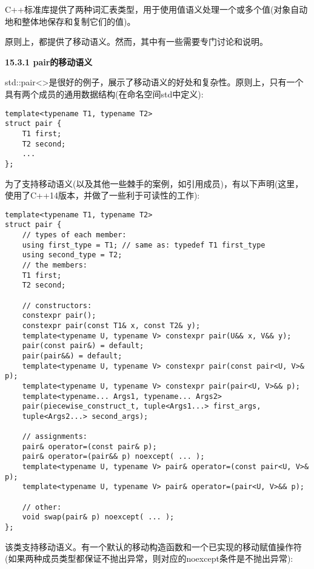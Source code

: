 C++标准库提供了两种词汇表类型，用于使用值语义处理一个或多个值(对象自动地和整体地保存和复制它们的值)。\par

原则上，都提供了移动语义。然而，其中有一些需要专门讨论和说明。\par

\hspace*{\fill} \par %
\textbf{15.3.1 pair的移动语义}

std::pair<>是很好的例子，展示了移动语义的好处和复杂性。原则上，只有一个具有两个成员的通用数据结构(在命名空间std中定义):\par

\begin{lstlisting}[caption={}]
template<typename T1, typename T2>
struct pair {
	T1 first;
	T2 second;
	...
};
\end{lstlisting}

为了支持移动语义(以及其他一些棘手的案例，如引用成员)，有以下声明(这里，使用了C++14版本，并做了一些利于可读性的工作):\par

\begin{lstlisting}[caption={}]
template<typename T1, typename T2>
struct pair {
	// types of each member:
	using first_type = T1; // same as: typedef T1 first_type
	using second_type = T2;
	// the members:
	T1 first;
	T2 second;
	
	// constructors:
	constexpr pair();
	constexpr pair(const T1& x, const T2& y);
	template<typename U, typename V> constexpr pair(U&& x, V&& y);
	pair(const pair&) = default;
	pair(pair&&) = default;
	template<typename U, typename V> constexpr pair(const pair<U, V>& p);
	template<typename U, typename V> constexpr pair(pair<U, V>&& p);
	template<typename... Args1, typename... Args2>
	pair(piecewise_construct_t, tuple<Args1...> first_args,
	tuple<Args2...> second_args);
	
	// assignments:
	pair& operator=(const pair& p);
	pair& operator=(pair&& p) noexcept( ... );
	template<typename U, typename V> pair& operator=(const pair<U, V>& p);
	template<typename U, typename V> pair& operator=(pair<U, V>&& p);
	
	// other:
	void swap(pair& p) noexcept( ... );
};
\end{lstlisting}

该类支持移动语义。有一个默认的移动构造函数和一个已实现的移动赋值操作符(如果两种成员类型都保证不抛出异常，则对应的noexcept条件是不抛出异常):\par

